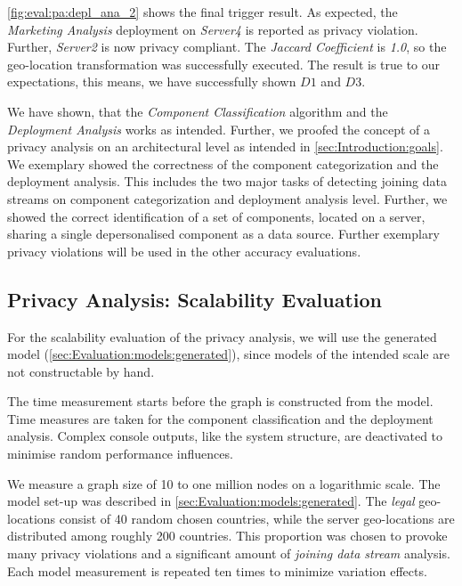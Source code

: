 \autoref{fig:eval:pa:depl_ana_2} shows the final trigger result. As expected, the \textit{Marketing Analysis} deployment on \textit{Server4} is reported as privacy violation. Further, \textit{Server2} is now privacy compliant. The \textit{Jaccard Coefficient} is \textit{1.0}, so the geo-location transformation was successfully executed. The result is true to our expectations, this means, we have successfully shown $D1$ and $D3$.

We have shown, that the \textit{Component Classification} algorithm and the \textit{Deployment Analysis} works as intended. Further, we proofed the concept of a privacy analysis on an architectural level as intended in \autoref{sec:Introduction:goals}. We exemplary showed the correctness of the component categorization and the deployment analysis. This includes the two major tasks of detecting joining data streams on component categorization and deployment analysis level. Further, we showed the correct identification of a set of components, located on a server, sharing a single depersonalised component as a data source. Further exemplary privacy violations will be used in the other accuracy evaluations.

\subsection{Privacy Analysis: Scalability Evaluation}
\label{sec:Evaluation:privacyanalysis:scale}

For the scalability evaluation of the privacy analysis, we will use the generated model (\autoref{sec:Evaluation:models:generated}), since models of the intended scale are not constructable by hand.

The time measurement starts before the graph is constructed from the model. Time measures are taken for the component classification and the deployment analysis. Complex console outputs, like the system structure, are deactivated to minimise random performance influences.

We measure a graph size of 10 to one million nodes on a logarithmic scale. The model set-up was described in \autoref{sec:Evaluation:models:generated}. The \textit{legal} geo-locations consist of 40 random chosen countries, while the server geo-locations are distributed among roughly 200 countries. This proportion was chosen to provoke many privacy violations and a significant amount of \textit{joining data stream} analysis. Each model measurement is repeated ten times to minimize variation effects.

